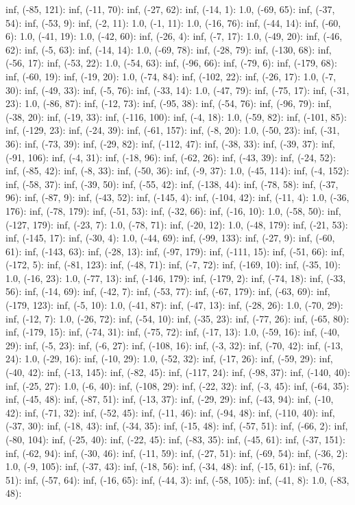 \documentclass[parskip=half]{scrartcl}
\begin{document}
inf, (-85, 121): inf, (-11, 70): inf, (-27, 62): inf, (-14, 1): 1.0, (-69, 65): inf, (-37, 54): inf, (-53, 9): inf, (-2, 11): 1.0, (-1, 11): 1.0, (-16, 76): inf, (-44, 14): inf, (-60, 6): 1.0, (-41, 19): 1.0, (-42, 60): inf, (-26, 4): inf, (-7, 17): 1.0, (-49, 20): inf, (-46, 62): inf, (-5, 63): inf, (-14, 14): 1.0, (-69, 78): inf, (-28, 79): inf, (-130, 68): inf, (-56, 17): inf, (-53, 22): 1.0, (-54, 63): inf, (-96, 66): inf, (-79, 6): inf, (-179, 68): inf, (-60, 19): inf, (-19, 20): 1.0, (-74, 84): inf, (-102, 22): inf, (-26, 17): 1.0, (-7, 30): inf, (-49, 33): inf, (-5, 76): inf, (-33, 14): 1.0, (-47, 79): inf, (-75, 17): inf, (-31, 23): 1.0, (-86, 87): inf, (-12, 73): inf, (-95, 38): inf, (-54, 76): inf, (-96, 79): inf, (-38, 20): inf, (-19, 33): inf, (-116, 100): inf, (-4, 18): 1.0, (-59, 82): inf, (-101, 85): inf, (-129, 23): inf, (-24, 39): inf, (-61, 157): inf, (-8, 20): 1.0, (-50, 23): inf, (-31, 36): inf, (-73, 39): inf, (-29, 82): inf, (-112, 47): inf, (-38, 33): inf, (-39, 37): inf, (-91, 106): inf, (-4, 31): inf, (-18, 96): inf, (-62, 26): inf, (-43, 39): inf, (-24, 52): inf, (-85, 42): inf, (-8, 33): inf, (-50, 36): inf, (-9, 37): 1.0, (-45, 114): inf, (-4, 152): inf, (-58, 37): inf, (-39, 50): inf, (-55, 42): inf, (-138, 44): inf, (-78, 58): inf, (-37, 96): inf, (-87, 9): inf, (-43, 52): inf, (-145, 4): inf, (-104, 42): inf, (-11, 4): 1.0, (-36, 176): inf, (-78, 179): inf, (-51, 53): inf, (-32, 66): inf, (-16, 10): 1.0, (-58, 50): inf, (-127, 179): inf, (-23, 7): 1.0, (-78, 71): inf, (-20, 12): 1.0, (-48, 179): inf, (-21, 53): inf, (-145, 17): inf, (-30, 4): 1.0, (-44, 69): inf, (-99, 133): inf, (-27, 9): inf, (-60, 61): inf, (-143, 63): inf, (-28, 13): inf, (-97, 179): inf, (-111, 15): inf, (-51, 66): inf, (-172, 5): inf, (-81, 123): inf, (-48, 71): inf, (-7, 72): inf, (-169, 10): inf, (-35, 10): 1.0, (-16, 23): 1.0, (-77, 13): inf, (-146, 179): inf, (-179, 2): inf, (-74, 18): inf, (-33, 56): inf, (-14, 69): inf, (-42, 7): inf, (-53, 77): inf, (-67, 179): inf, (-63, 69): inf, (-179, 123): inf, (-5, 10): 1.0, (-41, 87): inf, (-47, 13): inf, (-28, 26): 1.0, (-70, 29): inf, (-12, 7): 1.0, (-26, 72): inf, (-54, 10): inf, (-35, 23): inf, (-77, 26): inf, (-65, 80): inf, (-179, 15): inf, (-74, 31): inf, (-75, 72): inf, (-17, 13): 1.0, (-59, 16): inf, (-40, 29): inf, (-5, 23): inf, (-6, 27): inf, (-108, 16): inf, (-3, 32): inf, (-70, 42): inf, (-13, 24): 1.0, (-29, 16): inf, (-10, 29): 1.0, (-52, 32): inf, (-17, 26): inf, (-59, 29): inf, (-40, 42): inf, (-13, 145): inf, (-82, 45): inf, (-117, 24): inf, (-98, 37): inf, (-140, 40): inf, (-25, 27): 1.0, (-6, 40): inf, (-108, 29): inf, (-22, 32): inf, (-3, 45): inf, (-64, 35): inf, (-45, 48): inf, (-87, 51): inf, (-13, 37): inf, (-29, 29): inf, (-43, 94): inf, (-10, 42): inf, (-71, 32): inf, (-52, 45): inf, (-11, 46): inf, (-94, 48): inf, (-110, 40): inf, (-37, 30): inf, (-18, 43): inf, (-34, 35): inf, (-15, 48): inf, (-57, 51): inf, (-66, 2): inf, (-80, 104): inf, (-25, 40): inf, (-22, 45): inf, (-83, 35): inf, (-45, 61): inf, (-37, 151): inf, (-62, 94): inf, (-30, 46): inf, (-11, 59): inf, (-27, 51): inf, (-69, 54): inf, (-36, 2): 1.0, (-9, 105): inf, (-37, 43): inf, (-18, 56): inf, (-34, 48): inf, (-15, 61): inf, (-76, 51): inf, (-57, 64): inf, (-16, 65): inf, (-44, 3): inf, (-58, 105): inf, (-41, 8): 1.0, (-83, 48): 
\end{document}
